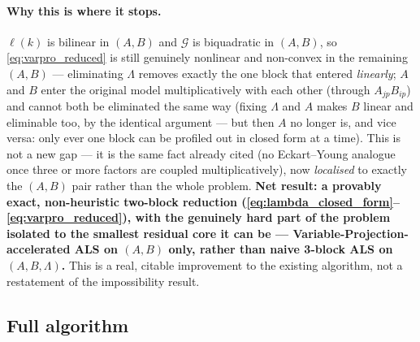 \documentclass{article}
\begin{document}
\paragraph{Why this is where it stops.} $\boldsymbol\ell(k)$ is bilinear in $(A,B)$ and
$\mathcal{G}$ is biquadratic in $(A,B)$, so \eqref{eq:varpro_reduced} is still genuinely nonlinear
and non-convex in the remaining $(A,B)$ — eliminating $\Lambda$ removes exactly the one block that
entered \emph{linearly}; $A$ and $B$ enter the original model multiplicatively with each other
(through $A_{jp}B_{ip}$) and cannot both be eliminated the same way (fixing $\Lambda$ and $A$ makes
$B$ linear and eliminable too, by the identical argument — but then $A$ no longer is, and vice
versa: only ever one block can be profiled out in closed form at a time). This is not a new gap —
it is the same fact already cited (no Eckart--Young analogue once three or more factors are
coupled multiplicatively), now \emph{localised} to exactly the $(A,B)$ pair rather than the whole
problem. \textbf{Net result: a provably exact, non-heuristic two-block reduction
(\eqref{eq:lambda_closed_form}--\eqref{eq:varpro_reduced}), with the genuinely hard part of the
problem isolated to the smallest residual core it can be — Variable-Projection-accelerated ALS on
$(A,B)$ only, rather than naive 3-block ALS on $(A,B,\Lambda)$.} This is a real, citable
improvement to the existing algorithm, not a restatement of the impossibility result.

\subsection{Full algorithm}
\label{sec:full_algorithm}
\end{document}
